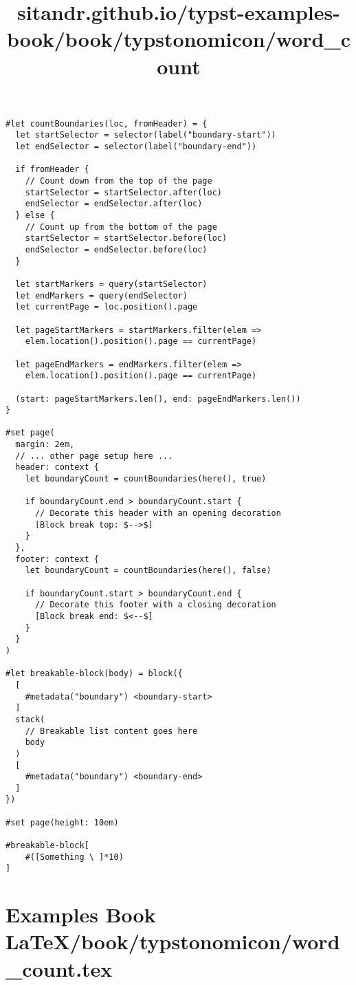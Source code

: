 \begin{verbatim}
#let countBoundaries(loc, fromHeader) = {
  let startSelector = selector(label("boundary-start"))
  let endSelector = selector(label("boundary-end"))

  if fromHeader {
    // Count down from the top of the page
    startSelector = startSelector.after(loc)
    endSelector = endSelector.after(loc)
  } else {
    // Count up from the bottom of the page
    startSelector = startSelector.before(loc)
    endSelector = endSelector.before(loc)
  }

  let startMarkers = query(startSelector)
  let endMarkers = query(endSelector)
  let currentPage = loc.position().page

  let pageStartMarkers = startMarkers.filter(elem =>
    elem.location().position().page == currentPage)

  let pageEndMarkers = endMarkers.filter(elem =>
    elem.location().position().page == currentPage)

  (start: pageStartMarkers.len(), end: pageEndMarkers.len())
}

#set page(
  margin: 2em,
  // ... other page setup here ...
  header: context {
    let boundaryCount = countBoundaries(here(), true)

    if boundaryCount.end > boundaryCount.start {
      // Decorate this header with an opening decoration
      [Block break top: $-->$]
    }
  },
  footer: context {
    let boundaryCount = countBoundaries(here(), false)

    if boundaryCount.start > boundaryCount.end {
      // Decorate this footer with a closing decoration
      [Block break end: $<--$]
    }
  }
)

#let breakable-block(body) = block({
  [
    #metadata("boundary") <boundary-start>
  ]
  stack(
    // Breakable list content goes here
    body
  )
  [
    #metadata("boundary") <boundary-end>
  ]
})

#set page(height: 10em)

#breakable-block[
    #([Something \ ]*10)
]
\end{verbatim}

\pandocbounded{}

\pandocbounded{}


\section{Examples Book LaTeX/book/typstonomicon/word_count.tex}
\title{sitandr.github.io/typst-examples-book/book/typstonomicon/word_count}

